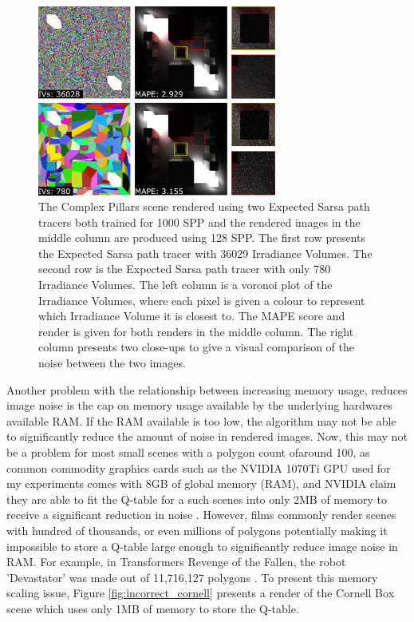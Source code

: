 \documentclass[../dissertation.tex]{subfiles}
\begin{document}
\begin{figure}[h]
\centering
\includegraphics[width=0.7\textwidth]{images/less_volumes.png}   
\caption{The Complex Pillars scene rendered using two Expected Sarsa path tracers both trained for 1000 SPP and the rendered images in the middle column are produced using 128 SPP. The first row presents the Expected Sarsa path tracer with 36029 Irradiance Volumes. The second row is the Expected Sarsa path tracer with only 780 Irradiance Volumes. The left column is a voronoi plot of the Irradiance Volumes, where each pixel is given a colour to represent which Irradiance Volume it is closest to. The MAPE score and render is given for both renders in the middle column. The right column presents two close-ups to give a visual comparison of the noise between the two images.}
\label{fig:voronoi_difference}
\end{figure}

Another problem with the relationship between increasing memory usage, reduces image noise is the cap on memory usage available by the underlying hardwares available RAM. If the RAM available is too low, the algorithm may not be able to significantly reduce the amount of noise in rendered images. Now, this may not be a problem for most small scenes with a polygon count ofaround 100, as common commodity graphics cards such as the NVIDIA 1070Ti GPU used for my experiments comes with 8GB of global memory (RAM), and NVIDIA claim they are able to fit the Q-table for a such scenes into only 2MB of memory to receive a significant reduction in noise \cite{dahm2017learning}. However, films commonly render scenes with hundred of thousands, or even millions of polygons potentially making it impossible to store a Q-table large enough to significantly reduce image noise in RAM. For example, in Transformers Revenge of the Fallen, the robot 'Devastator' was made out of 11,716,127 polygons \cite{devastator}. To present this memory scaling issue, Figure \ref{fig:incorrect_cornell} presents a render of the Cornell Box scene which uses only 1MB of memory to store the Q-table.\\
\end{document}
